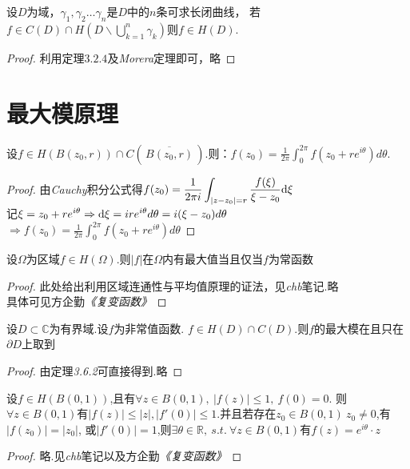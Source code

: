 \begin{eg}
	设$D$为域，$\gamma_1,\gamma_2\dots \gamma_n$是$D$中的$n$条可求长闭曲线，
	若$\displaystyle{f\in C(D)\cap H(D\backslash \mathop{\bigcup}\limits_{k=1}^{n}\gamma_k)}$则$f\in H(D)$.
\end{eg}
\begin{proof}
	利用定理$3.2.4$及\emph{Morera}定理即可，略
\end{proof}

\section{最大模原理}
\begin{theorem}[平均值定理]
	设$f\in H(B(z_0,r))\cap C(\,\overline{B(z_0,r)}\,)$.则：$\displaystyle{f(z_0)=\frac{1}{2\pi}\int_0^{2\pi}f(z_0+re^{i\theta})d\theta}$.
\end{theorem}
\begin{proof}
	由\emph{Cauchy}积分公式得$\displaystyle{f(z_0)=\frac{1}{2\pi i}\int_{|z-z_0|=r}\frac{f(\xi)}{\xi-z_0}\mathrm{d}\xi}$\\
	记$\displaystyle{\xi=z_0+re^{i\theta}\Rightarrow \mathrm{d}\xi=ire^{i\theta}d\theta=i(\xi-z_0)d\theta}$\\
	$\displaystyle{\Rightarrow f(z_0)=\frac{1}{2\pi}\int_0^{2\pi}f(z_0+re^{i\theta})d\theta}$
\end{proof}
\begin{theorem}[最大模定理]
	设$\Omega$为区域$f\in H(\Omega)$.则$|f|$在$\Omega$内有最大值当且仅当$f$为常函数
\end{theorem}
\begin{proof}
	此处给出利用区域连通性与平均值原理的证法，见\emph{chb}笔记.略\\
	具体可见方企勤\emph{《复变函数》}
\end{proof}

\begin{theorem}
	设$D\subset\mathbb{C}$为有界域.设$f$为非常值函数.
	$f\in H(D)\cap C(D)$.则$f$的最大模在且只在$\partial D$上取到
\end{theorem}
\begin{proof}
	由定理\emph{3.6.2}可直接得到.略
\end{proof}

\begin{theorem}[Schwarz引理]
	设$f\in H(B(0,1))$,且有$\forall z\in B(0,1),\ |f(z)|\leq1,\ f(0)=0$.
	则$\forall z\in B(0,1)$有$|f(z)|\leq|z|,|f'(0)|\leq1.$并且若存在$z_0\in B(0,1)\ z_0\neq 0$,有$|f(z_0)|=|z_0|$,
	或$|f'(0)|=1$,则$\exists\theta\in\mathbb{R},\ s.t.\ \forall z\in B(0,1)$有$f(z)=e^{i\theta}\cdot z$
\end{theorem}
\begin{proof}
	略.见\emph{chb}笔记以及方企勤\emph{《复变函数》}
\end{proof}


